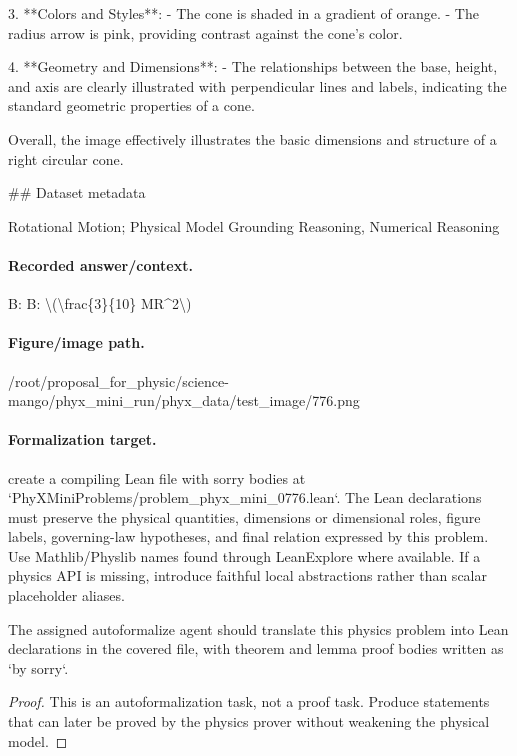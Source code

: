 3. **Colors and Styles**:
   - The cone is shaded in a gradient of orange.
   - The radius arrow is pink, providing contrast against the cone’s color.

4. **Geometry and Dimensions**:
   - The relationships between the base, height, and axis are clearly illustrated with perpendicular lines and labels, indicating the standard geometric properties of a cone.

Overall, the image effectively illustrates the basic dimensions and structure of a right circular cone.

\#\# Dataset metadata

Rotational Motion; Physical Model Grounding Reasoning, Numerical Reasoning

\paragraph{Recorded answer/context.}
B: B: \textbackslash{}(\textbackslash{}frac\{3\}\{10\} MR\textasciicircum{}2\textbackslash{})

\paragraph{Figure/image path.}
/root/proposal\_for\_physic/science-mango/phyx\_mini\_run/phyx\_data/test\_image/776.png

\paragraph{Formalization target.}
create a compiling Lean file with sorry bodies at `PhyXMiniProblems/problem\_phyx\_mini\_0776.lean`. The Lean declarations must preserve the physical quantities, dimensions or dimensional roles, figure labels, governing-law hypotheses, and final relation expressed by this problem.
Use Mathlib/Physlib names found through LeanExplore where available. If a physics API is missing, introduce faithful local abstractions rather than scalar placeholder aliases.

\begin{theorem}
\label{thm:physics:phyx_mini_0776:target}
The assigned autoformalize agent should translate this physics problem into Lean declarations in the covered file, with theorem and lemma proof bodies written as `by sorry`.
\end{theorem}
\begin{proof}
This is an autoformalization task, not a proof task. Produce statements that can later be proved by the physics prover without weakening the physical model.
\end{proof}

